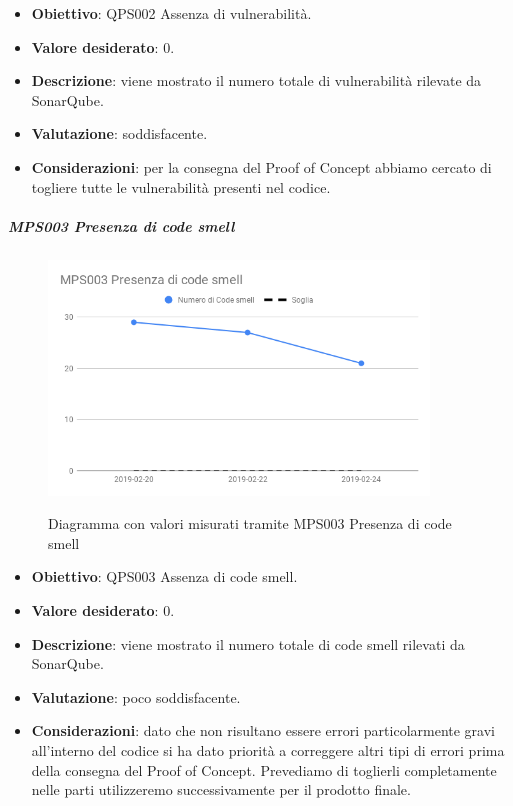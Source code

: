     \begin{itemize}
        \item \textbf{Obiettivo}: QPS002 Assenza di vulnerabilità.
        \item \textbf{Valore desiderato}: 0.
        \item \textbf{Descrizione}: viene mostrato il numero totale di vulnerabilità rilevate da SonarQube.
        \item \textbf{Valutazione}: soddisfacente.
        \item \textbf{Considerazioni}: per la consegna del Proof of Concept abbiamo cercato di togliere tutte le vulnerabilità presenti nel codice.
    \end{itemize}

    \subparagraph{MPS003 Presenza di code smell}

    \begin{figure}[H]
        \centering
        \includegraphics[width=0.9\textwidth]{img/cruscotti/RP/MPS003.png}
        \label{immaginePresenzaCodeSmellRP}
        \caption{Diagramma con valori misurati tramite MPS003 Presenza di code smell}
    \end{figure}

    \begin{itemize}
        \item \textbf{Obiettivo}: QPS003 Assenza di code smell.
        \item \textbf{Valore desiderato}: 0.
        \item \textbf{Descrizione}: viene mostrato il numero totale di code smell rilevati da SonarQube.
        \item \textbf{Valutazione}: poco soddisfacente.
        \item \textbf{Considerazioni}: dato che non risultano essere errori particolarmente gravi all'interno del codice si ha dato priorità a correggere altri tipi di errori prima della consegna del Proof of Concept. Prevediamo di toglierli completamente nelle parti utilizzeremo successivamente per il prodotto finale.
    \end{itemize}


